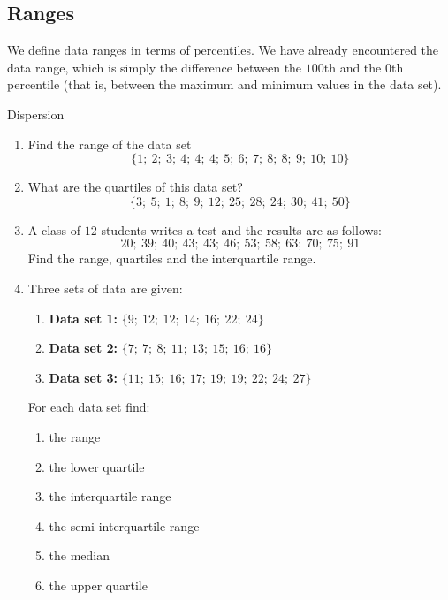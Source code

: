 \subsection{Ranges}
We define data ranges in terms of percentiles. We have already
encountered the data range, which is simply the difference between the
$100$th and the $0$th percentile (that is, between the maximum and
minimum values in the data set).



\begin{exercises}{Dispersion}
  \begin{enumerate}

  \item Find the range of the data set
    \begin{equation}
      \{1;\ 2;\ 3;\ 4;\ 4;\ 4;\ 5;\ 6;\ 7;\ 8;\ 8;\ 9;\ 10;\ 10\}
    \end{equation}

  \item What are the quartiles of this data set?
    \begin{equation}
      \{3;\ 5;\ 1;\ 8;\ 9;\ 12;\ 25;\ 28;\ 24;\ 30;\ 41;\ 50\}
    \end{equation}

  \item A class of $12$ students writes a test and the results are as
    follows:
    \begin{equation}
      20;\ 39;\ 40;\ 43;\ 43;\ 46;\ 53;\ 58;\ 63;\ 70;\ 75;\ 91
    \end{equation}
    Find the range, quartiles and the interquartile range.

  \item Three sets of data are given:
    \begin{enumerate}
    \item \textbf{Data set 1:} $\{9;\ 12;\ 12;\ 14;\ 16;\ 22;\ 24\}$
    \item \textbf{Data set 2:} $\{7;\ 7;\ 8;\ 11;\ 13;\ 15;\ 16;\ 16\}$
    \item \textbf{Data set 3:} $\{11;\ 15;\ 16;\ 17;\ 19;\ 19;\ 22;\ 24;\ 27\}$
    \end{enumerate}
    For each data set find:
    \begin{enumerate}
    \item the range
    \item the lower quartile
    \item the interquartile range
    \item the semi-interquartile range
    \item the median
    \item the upper quartile
    \end{enumerate}

  \end{enumerate}
\end{exercises}

